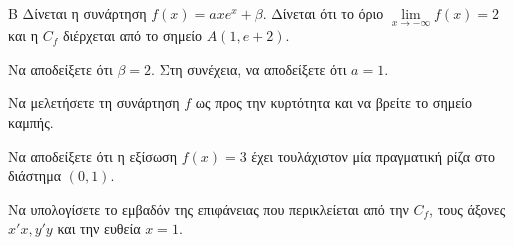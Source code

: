 \begin{thema}{Β}
Δίνεται η συνάρτηση $f(x) = a x e^x + \beta$. Δίνεται ότι το όριο $\lim\limits_{x \to -\infty} f(x) = 2$ και η $C_f$ διέρχεται από το σημείο $A(1, e+2)$.
\begin{erwthma}
  \item Να αποδείξετε ότι $\beta=2$. Στη συνέχεια, να αποδείξετε ότι $a=1$.
  \item Να μελετήσετε τη συνάρτηση $f$ ως προς την κυρτότητα και να βρείτε το σημείο καμπής.
  \item Να αποδείξετε ότι η εξίσωση $f(x) = 3$ έχει τουλάχιστον μία πραγματική ρίζα στο διάστημα $(0, 1)$.
  \item Να υπολογίσετε το εμβαδόν της επιφάνειας που περικλείεται από την $C_f$, τους άξονες $x'x, y'y$ και την ευθεία $x=1$.
\end{erwthma}
\end{thema}
